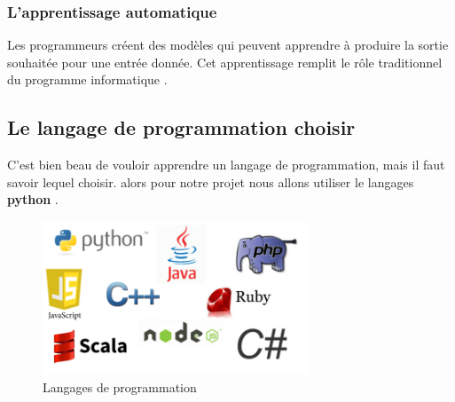\documentclass[12pt]{report}
\begin{document}
\subsubsection{L'apprentissage automatique}
Les programmeurs créent des modèles qui peuvent apprendre à produire la sortie souhaitée pour une entrée donnée. Cet apprentissage remplit le rôle traditionnel du programme informatique \cite{ref25} .
\subsection{Le langage de programmation choisir}
C'est bien beau de vouloir apprendre un langage de programmation, mais il faut savoir lequel choisir. alors pour notre projet nous allons utiliser le langages \textbf{python} .
\begin{figure}[h]
\begin{center}
\includegraphics[width=300]{cchoil.png}
\caption{Langages de programmation}
\end{center}

\end{figure}
\end{document}
